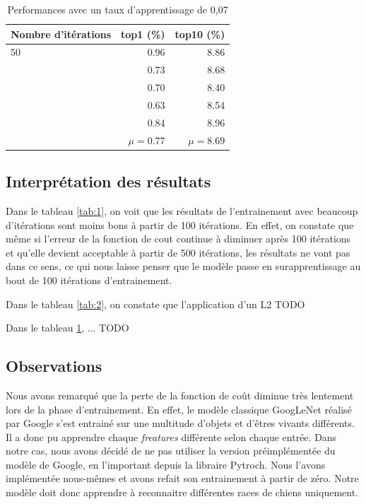 \documentclass{article}
\begin{document}
\begin{table}[htbp]
\centering
\begin{tabular}{lrr}  
\toprule
Nombre d'itérations & top1 (\%) & top10 (\%) \\
\midrule
50 & 0.96 & 8.86 \\
     & 0.73 & 8.68 \\
     & 0.70 & 8.40 \\
     & 0.63 & 8.54 \\
     & 0.84 & 8.96 \\
     & $\mu = 0.77$ &  $\mu = 8.69$ \\
\bottomrule
\end{tabular}
\caption{Performances avec un taux d'apprentissage de 0,07}
\label{tab:3}
\end{table}

\subsection{Interprétation des résultats}
Dans le tableau \ref{tab:1}, on voit que les résultats de l’entrainement avec
beaucoup d’itérations sont moins bons à partir de 100 itérations. En effet, on
constate que même si l’erreur de la fonction de cout continue à diminuer après
100 itérations et qu’elle devient acceptable à partir de 500 itérations, les
résultats ne vont pas dans ce sens, ce qui nous laisse penser que le modèle
passe en surapprentissage au bout de 100 itérations d’entrainement.

Dans le tableau \ref{tab:2}, on constate que l'application d'un L2 TODO

Dans le tableau \ref{tab:3}, ... TODO

\subsection{Observations}
Nous avons remarqué que la perte de la fonction de coût diminue très lentement
lors de la phase d’entrainement. En effet, le modèle classique GoogLeNet réalisé
par Google s’est entrainé sur une multitude d’objets et d'êtres vivants
différents. Il a donc pu apprendre chaque \textit{freatures} différente selon
chaque entrée. Dans notre cas, nous avons décidé de ne pas utiliser la version
préimplémentée du modèle de Google, en l'important depuis la libraire Pytroch.
Nous l'avons implémentée nous-mêmes et avons refait son entrainement à
partir de zéro. Notre modèle doit donc apprendre à reconnaitre différentes races
de chiens uniquement.
\end{document}
